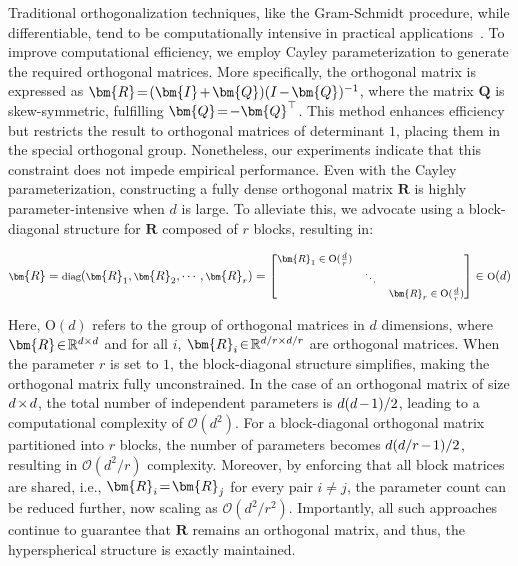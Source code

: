 Traditional orthogonalization techniques, like the Gram-Schmidt procedure, while differentiable, tend to be computationally intensive in practical applications~\cite{liu2021orthogonal}. To improve computational efficiency, we employ Cayley parameterization to generate the required orthogonal matrices. More specifically, the orthogonal matrix is expressed as $\thickmuskip=2mu \medmuskip=2mu \bm{R}=(\bm{I}+\bm{Q})(I-\bm{Q})^{-1}$, where the matrix $\bm{Q}$ is skew-symmetric, fulfilling $\thickmuskip=2mu \medmuskip=2mu \bm{Q} = -\bm{Q}^\top$. This method enhances efficiency but restricts the result to orthogonal matrices of determinant $1$, placing them in the special orthogonal group. Nonetheless, our experiments indicate that this constraint does not impede empirical performance. Even with the Cayley parameterization, constructing a fully dense orthogonal matrix $\bm{R}$ is highly parameter-intensive when $d$ is large. To alleviate this, we advocate using a block-diagonal structure for $\bm{R}$ composed of $r$ blocks, resulting in:

\begin{equation}
    \footnotesize
    \bm{R} = \text{diag}(\bm{R}_1, \bm{R}_2, \cdots, \bm{R}_r) = \begin{bmatrix}
    \bm{R}_1 \in \text{O}(\frac{d}{r}) &  &\\
    &\ddots & \\
    & & \bm{R}_r \in \text{O}(\frac{d}{r})
    \end{bmatrix} \in \text{O}(d)
\end{equation}

Here, $\text{O}(d)$ refers to the group of orthogonal matrices in $d$ dimensions, where $\thickmuskip=2mu \medmuskip=2mu \bm{R}\in\mathbb{R}^{d\times d}$ and for all $i$, $\thickmuskip=2mu \medmuskip=2mu \bm{R}_i\in\mathbb{R}^{d/r\times d/r}$ are orthogonal matrices. When the parameter $r$ is set to $1$, the block-diagonal structure simplifies, making the orthogonal matrix fully unconstrained. In the case of an orthogonal matrix of size $\thickmuskip=2mu \medmuskip=2mu d\times d$, the total number of independent parameters is $\thickmuskip=2mu \medmuskip=2mu d(d-1)/2$, leading to a computational complexity of $\mathcal{O}(d^2)$. For a block-diagonal orthogonal matrix partitioned into $r$ blocks, the number of parameters becomes $\thickmuskip=2mu \medmuskip=2mu d(d/r-1)/2$, resulting in $\mathcal{O}(d^2/r)$ complexity. Moreover, by enforcing that all block matrices are shared, i.e., $\thickmuskip=2mu \medmuskip=2mu\bm{R}_i=\bm{R}_j$ for every pair $i\neq j$, the parameter count can be reduced further, now scaling as $\mathcal{O}(d^2/r^2)$. Importantly, all such approaches continue to guarantee that $\bm{R}$ remains an orthogonal matrix, and thus, the hyperspherical structure is exactly maintained.

